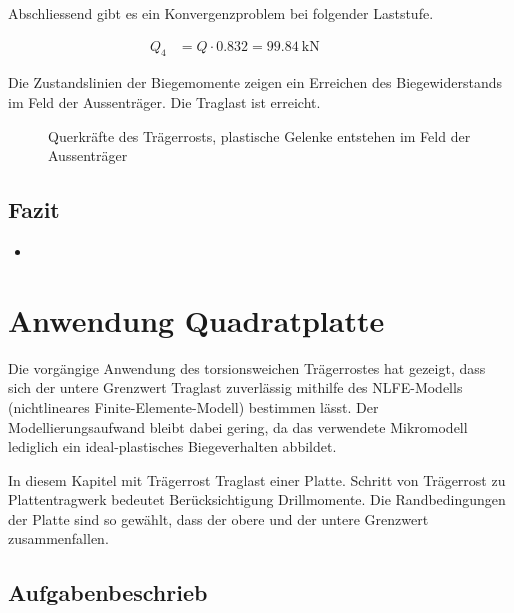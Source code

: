 \documentclass[
  11pt,
  letterpaper,
]{scrreprt}
\makeatletter
\providecommand{\tightlist}{%
  \setlength{\itemsep}{0pt}\setlength{\parskip}{0pt}}\usepackage{longtable,booktabs,array}
\newcommand*\pandocbounded[1]{%
  \sbox\pandoc@box{#1}%
  \Gscale@div\@tempa{\textheight}{\dimexpr\ht\pandoc@box+\dp\pandoc@box\relax}%
  \Gscale@div\@tempb{\linewidth}{\wd\pandoc@box}%
  \ifdim\@tempb\p@<\@tempa\p@\let\@tempa\@tempb\fi%
  \ifdim\@tempa\p@<\p@\scalebox{\@tempa}{\usebox\pandoc@box}%
  \else\usebox{\pandoc@box}%
  \fi%
}
\makeatother
\begin{document}
Abschliessend gibt es ein Konvergenzproblem bei folgender Laststufe.

\[
\begin{aligned}
Q_{4}& = Q \cdot 0.832 = 99.84 \ \mathrm{kN} \quad &  \quad &  
 \end{aligned}
\]

Die Zustandslinien der Biegemomente zeigen ein Erreichen des
Biegewiderstands im Feld der Aussenträger. Die Traglast ist erreicht.

\begin{figure}[H]

\centering{

\pandocbounded{}

}

\caption{\label{fig-trm_4}Querkräfte des Trägerrosts, plastische Gelenke
entstehen im Feld der Aussenträger}

\end{figure}%

\section{Fazit}\label{fazit-1}

\begin{itemize}
\tightlist
\item
\end{itemize}


\chapter{Anwendung Quadratplatte}\label{anwendung-quadratplatte}

Die vorgängige Anwendung des torsionsweichen Trägerrostes hat gezeigt,
dass sich der untere Grenzwert Traglast zuverlässig mithilfe des
NLFE-Modells (nichtlineares Finite-Elemente-Modell) bestimmen lässt. Der
Modellierungsaufwand bleibt dabei gering, da das verwendete Mikromodell
lediglich ein ideal-plastisches Biegeverhalten abbildet.

In diesem Kapitel mit Trägerrost Traglast einer Platte. Schritt von
Trägerrost zu Plattentragwerk bedeutet Berücksichtigung Drillmomente.
Die Randbedingungen der Platte sind so gewählt, dass der obere und der
untere Grenzwert zusammenfallen.

\section{Aufgabenbeschrieb}\label{aufgabenbeschrieb-2}
\end{document}
